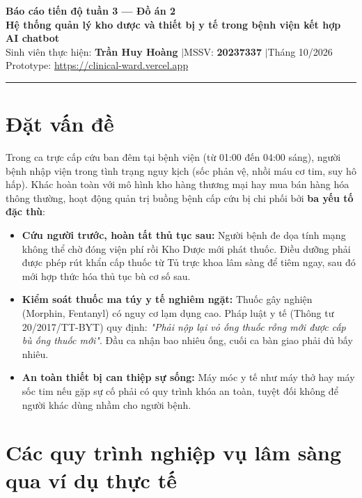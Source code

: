 \documentclass[11pt,a4paper]{article}
\begin{document}
\begin{center}
    {\Large\textbf{Báo cáo tiến độ tuần 3 — Đồ án 2}}\\[0.22em]
    {\large\textbf{Hệ thống quản lý kho dược và thiết bị y tế trong bệnh viện kết hợp AI chatbot}}\\[0.18em]
    {\normalsize Sinh viên thực hiện: \textbf{Trần Huy Hoàng} \quad$\vert$\quad MSSV: \textbf{20237337} \quad$\vert$\quad Tháng 10/2026}\\[0.12em]
    {\small Prototype: \url{https://clinical-ward.vercel.app}}
\end{center}

\vspace{-0.6em}
\noindent\rule{\textwidth}{0.4pt}
\vspace{-0.25em}

\section{Đặt vấn đề}

Trong ca trực cấp cứu ban đêm tại bệnh viện (từ 01:00 đến 04:00 sáng), người bệnh nhập viện trong tình trạng nguy kịch (sốc phản vệ, nhồi máu cơ tim, suy hô hấp). Khác hoàn toàn với mô hình kho hàng thương mại hay mua bán hàng hóa thông thường, hoạt động quản trị buồng bệnh cấp cứu bị chi phối bởi \textbf{ba yếu tố đặc thù}:
\begin{itemize}[leftmargin=*, itemsep=0.08em, topsep=0.06em]
    \item \textbf{Cứu người trước, hoàn tất thủ tục sau:} Người bệnh đe dọa tính mạng không thể chờ đóng viện phí rồi Kho Dược mới phát thuốc. Điều dưỡng phải được phép rút khẩn cấp thuốc từ Tủ trực khoa lâm sàng để tiêm ngay, sau đó mới hợp thức hóa thủ tục bù cơ số sau.
    \item \textbf{Kiểm soát thuốc ma túy y tế nghiêm ngặt:} Thuốc gây nghiện (Morphin, Fentanyl) có nguy cơ lạm dụng cao. Pháp luật y tế (Thông tư 20/2017/TT-BYT) quy định: \textit{"Phải nộp lại vỏ ống thuốc rỗng mới được cấp bù ống thuốc mới"}. Đầu ca nhận bao nhiêu ống, cuối ca bàn giao phải đủ bấy nhiêu.
    \item \textbf{An toàn thiết bị can thiệp sự sống:} Máy móc y tế như máy thở hay máy sốc tim nếu gặp sự cố phải có quy trình khóa an toàn, tuyệt đối không để người khác dùng nhầm cho người bệnh.
\end{itemize}

\vspace{-0.25em}
\section{Các quy trình nghiệp vụ lâm sàng qua ví dụ thực tế}
\end{document}
